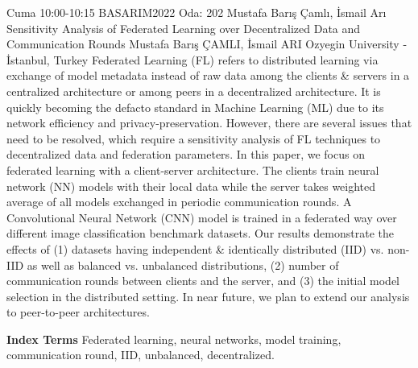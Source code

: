 
    \begin{abstract_basarim}
    {Cuma 10:00-10:15}
    {BASARIM2022}
    {Oda: 202}
    {Mustafa Barış Çamlı, İsmail Arı}
    {Sensitivity Analysis of Federated Learning over Decentralized Data and Communication Rounds}
    {%
    Mustafa Barış ÇAMLI, İsmail ARI}
    {%
    }
    {%
    Ozyegin University - İstanbul, Turkey}
    Federated Learning (FL) refers to distributed learning via exchange of model metadata instead of raw data among the clients & servers in a centralized architecture or among peers in a decentralized architecture. It is quickly becoming the defacto standard in Machine Learning (ML) due to its network efficiency and privacy-preservation. However, there are several issues that need to be resolved, which require a sensitivity analysis of FL techniques to decentralized data and federation parameters. In this paper, we focus on federated learning with a client-server architecture. The clients train neural network (NN) models with their local data while the server takes weighted average of all models exchanged in periodic communication rounds. A Convolutional Neural Network (CNN) model is trained in a federated way over different image classification benchmark datasets. Our results demonstrate the effects of (1) datasets having independent & identically distributed (IID) vs. non-IID as well as balanced vs. unbalanced distributions, (2) number of communication rounds between clients and the server, and (3) the initial model selection in the distributed setting. In near future, we plan to extend our analysis to peer-to-peer architectures. 
    
            \textbf{Index Terms} \newline{}Federated learning, neural networks, model training, communication round, IID, unbalanced, decentralized.
    \end{abstract_basarim}
    